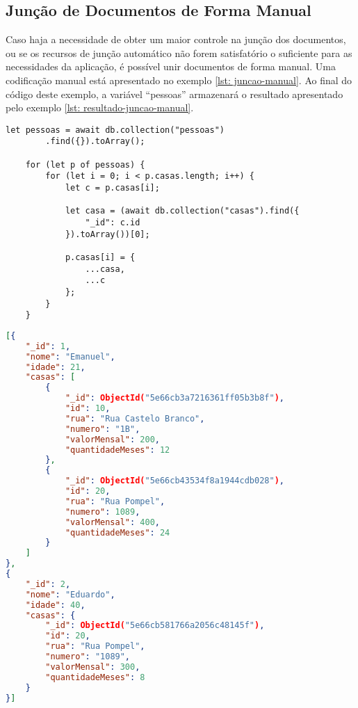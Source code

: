 \subsection{Junção de Documentos de Forma Manual}

Caso haja a necessidade de obter um maior controle na junção dos documentos, ou se os recursos de junção automático não forem satisfatório o suficiente para as necessidades da aplicação, é possível unir documentos de forma manual. Uma codificação manual está apresentado no exemplo \ref{lst: juncao-manual}. Ao final do código deste exemplo, a variável ``pessoas'' armazenará o resultado apresentado pelo exemplo \ref{lst: resultado-juncao-manual}.


\begin{lstlisting}[style=ES6, caption={Junção Manual dos Documentos de Pessoa com Casa\label{lst: juncao-manual}}]
    let pessoas = await db.collection("pessoas")
        .find({}).toArray();
    
    for (let p of pessoas) {
        for (let i = 0; i < p.casas.length; i++) {
            let c = p.casas[i];
    
            let casa = (await db.collection("casas").find({
                "_id": c.id
            }).toArray())[0];
    
            p.casas[i] = {
                ...casa,
                ...c
            };
        }
    }
\end{lstlisting}


\begin{lstlisting}[language=json, caption={Junção de Documentos de Forma Manual\label{lst: resultado-juncao-manual}}]
[{
    "_id": 1,
    "nome": "Emanuel",
    "idade": 21,
    "casas": [
        {
            "_id": ObjectId("5e66cb3a7216361ff05b3b8f"),
            "id": 10,
            "rua": "Rua Castelo Branco",
            "numero": "1B",
            "valorMensal": 200,
            "quantidadeMeses": 12
        },
        {
            "_id": ObjectId("5e66cb43534f8a1944cdb028"),
            "id": 20,
            "rua": "Rua Pompel",
            "numero": 1089,
            "valorMensal": 400,
            "quantidadeMeses": 24
        }
    ]
},
{
    "_id": 2,
    "nome": "Eduardo",
    "idade": 40,
    "casas": {
        "_id": ObjectId("5e66cb581766a2056c48145f"),
        "id": 20,
        "rua": "Rua Pompel",
        "numero": "1089",
        "valorMensal": 300,
        "quantidadeMeses": 8
    }
}]
\end{lstlisting}

